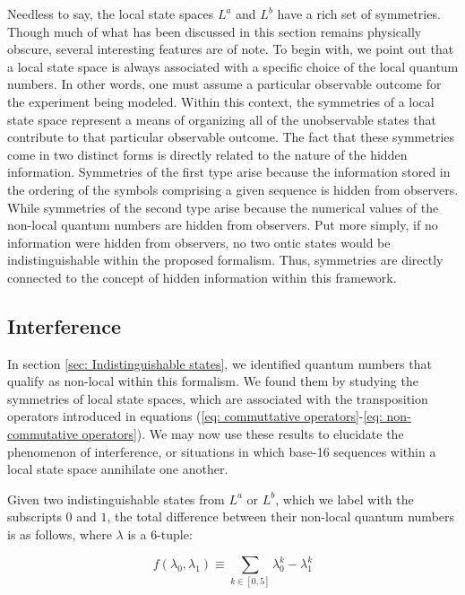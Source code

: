 \documentclass{article}
\begin{document}
Needless to say, the local state spaces $L^a$ and $L^b$ have a rich set of symmetries. Though much of what has been discussed in this section remains physically obscure, several interesting features are of note. To begin with, we point out that a local state space is always associated with a specific choice of the local quantum numbers. In other words, one must assume a particular observable outcome for the experiment being modeled. Within this context, the symmetries of a local state space represent a means of organizing all of the unobservable states that contribute to that particular observable outcome. The fact that these symmetries come in two distinct forms is directly related to the nature of the hidden information. Symmetries of the first type arise because the information stored in the ordering of the symbols comprising a given sequence is hidden from observers. While symmetries of the second type arise because the numerical values of the non-local quantum numbers are hidden from observers. Put more simply, if no information were hidden from observers, no two ontic states would be indistinguishable within the proposed formalism. Thus, symmetries are directly connected to the concept of hidden information within this framework. 

\subsection{Interference \label{sec: Interference}}

In section \ref{sec: Indistinguishable states}, we identified quantum numbers that qualify as non-local within this formalism. We found them by studying the symmetries of local state spaces, which are associated with the transposition operators introduced in equations (\ref{eq: commuttative operators}-\ref{eq: non-commutative operators}). We may now use these results to elucidate the phenomenon of interference, or situations in which base-16 sequences within a local state space annihilate one another. 

Given two indistinguishable states from $L^a$ or $L^b$, which we label with the subscripts $0$ and $1$, the total difference between their non-local quantum numbers is as follows, where $\lambda$ is a 6-tuple:

\begin{equation}
    f(\lambda_0,\lambda_1)\equiv\sum_{k\in [0,5]}\lambda_0^{k}-\lambda_1^{k}
    \label{eq: interference term}
\end{equation}
\end{document}

